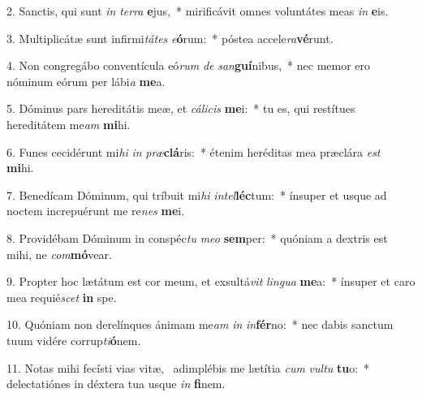 2. Sanctis, qui sunt \textit{in} \textit{ter}\textit{ra} \textbf{e}jus,~*  mirificávit omnes voluntátes meas \textit{in} \textbf{e}is.\

3. Multiplicátæ sunt infirmi\textit{tá}\textit{tes} \textit{e}\textbf{ó}rum:~*  póstea accele\textit{ra}\textbf{vé}runt.\

4. Non congregábo conventícula eó\textit{rum} \textit{de} \textit{san}\textbf{guí}nibus,~*  nec memor ero nóminum eórum per lábi\textit{a} \textbf{me}a.\

5. Dóminus pars hereditátis meæ, et \textit{cá}\textit{li}\textit{cis} \textbf{me}i:~*  tu es, qui restítues hereditátem me\textit{am} \textbf{mi}hi.\

6. Funes cecidérunt mi\textit{hi} \textit{in} \textit{præ}\textbf{clá}ris:~*  étenim heréditas mea præclára \textit{est} \textbf{mi}hi.\

7. Benedícam Dóminum, qui tríbuit mi\textit{hi} \textit{in}\textit{tel}\textbf{léc}tum:~*  ínsuper et usque ad noctem increpuérunt me re\textit{nes} \textbf{me}i.\

8. Providébam Dóminum in conspéc\textit{tu} \textit{me}\textit{o} \textbf{sem}per:~*  quóniam a dextris est mihi, ne \textit{com}\textbf{mó}vear.\

9. Propter hoc lætátum est cor meum, et exsultá\textit{vit} \textit{lin}\textit{gua} \textbf{me}a:~*  ínsuper et caro mea requié\textit{scet} \textbf{in} spe.\

10. Quóniam non derelínques ánimam me\textit{am} \textit{in} \textit{in}\textbf{fér}no:~*  nec dabis sanctum tuum vidére corrup\textit{ti}\textbf{ó}nem.\

11. Notas mihi fecísti vias vitæ, \dag\  adimplébis me lætítia \textit{cum} \textit{vul}\textit{tu} \textbf{tu}o:~*  delectatiónes in déxtera tua usque \textit{in} \textbf{fi}nem.\

